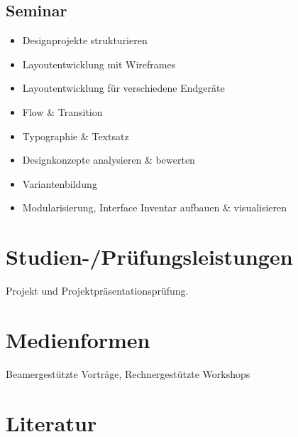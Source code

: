 \hypertarget{seminarpathlabelmi-2017modulbeschreibungen-bachelorba_screendesign}{%
\subsection*{Seminar\label{/mi-2017/modulbeschreibungen-bachelor/BA_Screendesign}}\label{seminarpathlabelmi-2017modulbeschreibungen-bachelorba_screendesign}}

\begin{itemize}
\tightlist
\item
  Designprojekte strukturieren
\item
  Layoutentwicklung mit Wireframes
\item
  Layoutentwicklung für verschiedene Endgeräte
\item
  Flow \& Transition
\item
  Typographie \& Textsatz
\item
  Designkonzepte analysieren \& bewerten
\item
  Variantenbildung
\item
  Modularisierung, Interface Inventar aufbauen \& visualisieren
\end{itemize}

\hypertarget{studien-pruxfcfungsleistungenpathlabelmi-2017modulbeschreibungen-bachelorba_screendesign}{%
\section*{Studien-/Prüfungsleistungen\label{/mi-2017/modulbeschreibungen-bachelor/BA_Screendesign}}\label{studien-pruxfcfungsleistungenpathlabelmi-2017modulbeschreibungen-bachelorba_screendesign}}

Projekt und Projektpräsentationsprüfung.

\hypertarget{medienformenpathlabelmi-2017modulbeschreibungen-bachelorba_screendesign}{%
\section*{Medienformen\label{/mi-2017/modulbeschreibungen-bachelor/BA_Screendesign}}\label{medienformenpathlabelmi-2017modulbeschreibungen-bachelorba_screendesign}}

Beamergestützte Vorträge, Rechnergestützte Workshops

\hypertarget{literaturpathlabelmi-2017modulbeschreibungen-bachelorba_screendesign}{%
\section*{Literatur\label{/mi-2017/modulbeschreibungen-bachelor/BA_Screendesign}}\label{literaturpathlabelmi-2017modulbeschreibungen-bachelorba_screendesign}}

